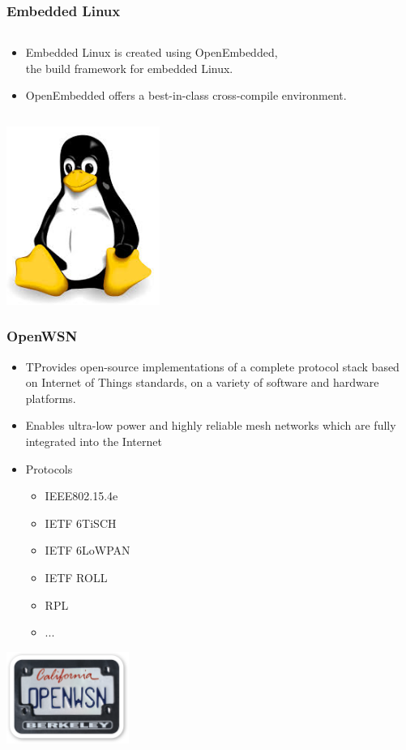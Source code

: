 \documentclass{beamer}
\begin{document}
\begin{frame}
	\frametitle{Embedded Linux}
	\begin{columns}[c]
		\begin{column}{30cm}
			\vspace{.1cm}
			\begin{itemize}
				\justifying
				\item Embedded Linux is created using OpenEmbedded,\\
				the build framework for embedded Linux.
				\item OpenEmbedded offers a best-in-class cross-compile environment.
			\end{itemize}
		\end{column}
	\end{columns}
	\vspace{.5cm}
	\hspace*{5.5cm} \includegraphics[width=5cm]{figs/linux-logo.jpeg}
\end{frame}

\begin{frame}
	\frametitle{OpenWSN}
	\begin{itemize}
		\item TProvides open-source implementations of a complete protocol stack based on Internet of Things standards, on a variety of software and hardware platforms.
		\item Enables ultra-low power and highly reliable mesh networks which are fully integrated into the Internet
		\item Protocols
				\begin{itemize}
					\item IEEE802.15.4e
					\item IETF 6TiSCH 
					\item IETF 6LoWPAN
					\item IETF ROLL
					\item RPL
					\item ...
				\end{itemize}
			\end{itemize}
	\hspace*{5.5cm} \includegraphics[width=4cm]{figs/openwsn-logo.png}
\end{frame}
\end{document}
